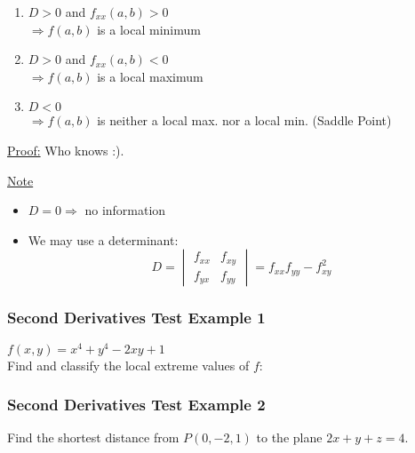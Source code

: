 \documentclass[12pt]{article}
\begin{document}
\fbox{
	\begin{minipage}{3.5in}
		\[
		D = D(a,b) = f_{xx}(a,b)f_{yy}(a,b) - [f_{xy}(a,b)]^2
		\]
	\end{minipage}
}

\begin{enumerate}
	\item \(D>0\) and \(f_{xx}(a,b) > 0\) \\
		\(\Rightarrow f(a,b)\) is a local minimum
	\item \(D>0\) and \(f_{xx}(a,b) < 0\)\\
		\(\Rightarrow f(a,b)\) is a local maximum
	\item \(D<0\) \\
		\(\Rightarrow f(a,b)\) is neither a local max. nor a local min. (Saddle Point)
\end{enumerate}

\underline{Proof:} Who knows :).

\underline{Note}
\begin{itemize}
	\item \(D=0 \Rightarrow \) no information
	\item We may use a determinant: 
		\[
			 D =
			\begin{vmatrix}
				f_{xx} & f_{xy} \\
				f_{yx} & f_{yy}
			\end{vmatrix}
			= f_{xx} f_{yy} - f_{xy}^2
		\]
\end{itemize}

\subsubsection{Second Derivatives Test Example 1}
\(f(x,y) = x^4 + y^4 -2xy + 1\) \\
Find and classify the local extreme values of \(f\): 

\subsubsection{Second Derivatives Test Example 2}
Find the shortest distance from \(P(0,-2,1)\) to the plane \(2x + y + z = 4\).
\end{document}
